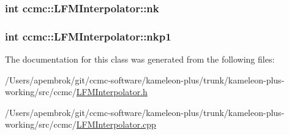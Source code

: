 \hypertarget{classccmc_1_1_l_f_m_interpolator_a5bd5a51d1dc53c2b9b0612ef1b1ab16f}{
\subsubsection[{nk}]{\setlength{\rightskip}{0pt plus 5cm}int ccmc\-::\-L\-F\-M\-Interpolator\-::nk}}\label{classccmc_1_1_l_f_m_interpolator_a5bd5a51d1dc53c2b9b0612ef1b1ab16f}
\hypertarget{classccmc_1_1_l_f_m_interpolator_a4f205cc413dcbb003175d4ac88d353c4}{
\subsubsection[{nkp1}]{\setlength{\rightskip}{0pt plus 5cm}int ccmc\-::\-L\-F\-M\-Interpolator\-::nkp1}}\label{classccmc_1_1_l_f_m_interpolator_a4f205cc413dcbb003175d4ac88d353c4}


The documentation for this class was generated from the following files\-:\begin{DoxyCompactItemize}
\item 
/\-Users/apembrok/git/ccmc-\/software/kameleon-\/plus/trunk/kameleon-\/plus-\/working/src/ccmc/\hyperlink{_l_f_m_interpolator_8h}{L\-F\-M\-Interpolator.\-h}\item 
/\-Users/apembrok/git/ccmc-\/software/kameleon-\/plus/trunk/kameleon-\/plus-\/working/src/ccmc/\hyperlink{_l_f_m_interpolator_8cpp}{L\-F\-M\-Interpolator.\-cpp}\end{DoxyCompactItemize}
